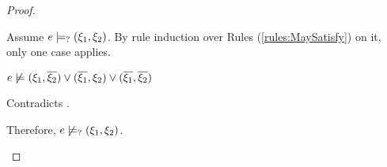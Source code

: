 \begin{proof}
\begin{byCases}
\begin{byCases}
\begin{byCases}
\begin{pfsteps*}
            \end{pfsteps*}
            Assume $e \models_{?} (\xi_1 , \xi_2)$. By rule induction over Rules (\ref{rules:MaySatisfy}) on it, only one case applies.
            \begin{byCases}
            \item[\text{(\ref{rule:CMSNotVal})}]
                \begin{pfsteps*}
                \item $e \not\models (\xi_1 , \overline{\xi_2}) \vee (\overline{\xi_1} , \xi_2) \vee (\overline{\xi_1} , \overline{\xi_2})$ 
                \end{pfsteps*}
                Contradicts .
            \end{byCases}
            Therefore, $e \not\models_{?} (\xi_1 , \xi_2)$.
            

\end{byCases}
\end{byCases}
\end{byCases}
\end{proof}
